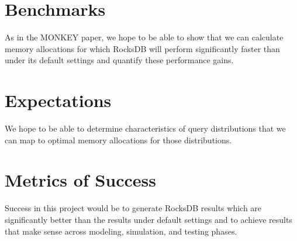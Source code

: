 \documentclass[11pt]{article}
\theoremstyle{plain}
\theoremstyle{definition}
\begin{document}
\section{Benchmarks}

As in the MONKEY paper, we hope to be able to show that we can calculate memory allocations for which RocksDB will perform significantly faster than under its default settings and quantify these performance gains.

\section{Expectations}

We hope to be able to determine characteristics of query distributions that we can map to optimal memory allocations for those distributions.

\section{Metrics of Success}

Success in this project would be to generate RocksDB results which are significantly better than the results under default settings and to achieve results that make sense across modeling, simulation, and testing phases.
\end{document}
